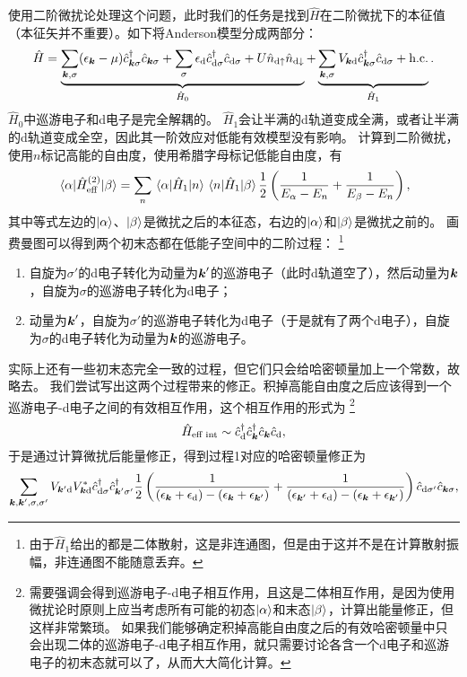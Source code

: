 \documentclass[hyperref, UTF8, a4paper]{ctexart}
\begin{document}
使用二阶微扰论处理这个问题，此时我们的任务是找到$\hat{H}$在二阶微扰下的本征值（本征矢并不重要）。如下将Anderson模型分成两部分：
\[
    \hat{H} = \underbrace{\sum_{\vb*{k}, \sigma} (\epsilon_{\vb*{k}} - \mu) \hat{c}_{\vb*{k}\sigma}^\dagger \hat{c}_{\vb*{k} \sigma} + \sum_\sigma \epsilon_\text{d} \hat{c}_{\text{d}\sigma}^\dagger \hat{c}_{\text{d} \sigma} + U \hat{n}_{\text{d} \uparrow} \hat{n}_{\text{d} \downarrow}}_{\hat{H}_0} + \underbrace{\sum_{\vb*{k}, \sigma} V_{\vb*{k} \text{d}} \hat{c}_{\vb*{k} \sigma}^\dagger \hat{c}_{\text{d} \sigma} + \text{h.c.}}_{\hat{H}_1}.
\]
$\hat{H}_0$中巡游电子和d电子是完全解耦的。
$\hat{H}_1$会让半满的d轨道变成全满，或者让半满的d轨道变成全空，因此其一阶效应对低能有效模型没有影响。
计算到二阶微扰，使用$n$标记高能的自由度，使用希腊字母标记低能自由度，有
\[
    \mel{\alpha}{\hat{H}_\text{eff}^{(2)}}{\beta} = \sum_n \mel{\alpha}{\hat{H}_1}{n} \mel{n}{\hat{H}_1}{\beta} \frac{1}{2} \left( \frac{1}{E_\alpha - E_n} + \frac{1}{E_\beta - E_n} \right),
\]
其中等式左边的$\ket{\alpha}$、$\ket{\beta}$是微扰之后的本征态，右边的$\ket{\alpha}$和$\ket{\beta}$是微扰之前的。
画费曼图可以得到两个初末态都在低能子空间中的二阶过程：%
\footnote{由于$\hat{H}_1$给出的都是二体散射，这是非连通图，但是由于这并不是在计算散射振幅，非连通图不能随意丢弃。}%
\begin{enumerate}
    \item 自旋为$\sigma'$的d电子转化为动量为$\vb*{k}'$的巡游电子（此时d轨道空了），然后动量为$\vb*{k}$，自旋为$\sigma$的巡游电子转化为d电子；
    \item 动量为$\vb*{k}'$，自旋为$\sigma'$的巡游电子转化为d电子（于是就有了两个d电子），自旋为$\sigma$的d电子转化为动量为$\vb*{k}$的巡游电子。
\end{enumerate}
实际上还有一些初末态完全一致的过程，但它们只会给哈密顿量加上一个常数，故略去。
我们尝试写出这两个过程带来的修正。积掉高能自由度之后应该得到一个巡游电子-d电子之间的有效相互作用，这个相互作用的形式为%
\footnote{需要强调会得到巡游电子-d电子相互作用，且这是二体相互作用，是因为使用微扰论时原则上应当考虑所有可能的初态$\ket{\alpha}$和末态$\ket{\beta}$，计算出能量修正，但这样非常繁琐。
如果我们能够确定积掉高能自由度之后的有效哈密顿量中只会出现二体的巡游电子-d电子相互作用，就只需要讨论各含一个d电子和巡游电子的初末态就可以了，从而大大简化计算。
}%
\[
    \hat{H}_\text{eff int} \sim \hat{c}^\dagger_{\text{d}} \hat{c}^\dagger_{\vb*{k}} \hat{c}_{\vb*{k}} \hat{c}_{\text{d}},
\]
于是通过计算微扰后能量修正，得到过程1对应的哈密顿量修正为
\[
    \sum_{\vb*{k}, \vb*{k}', \sigma, \sigma'} V_{\vb*{k}' \text{d}} V^*_{\vb*{k} \text{d}} 
    \hat{c}_{\text{d} \sigma}^\dagger \hat{c}^\dagger_{\vb*{k}' \sigma'} 
    \frac{1}{2} \left( 
        \frac{1}{(\epsilon_{\vb*{k}} + \epsilon_\text{d}) - (\epsilon_{\vb*{k}} + \epsilon_{\vb*{k}'})} + \frac{1}{(\epsilon_{\vb*{k}'} + \epsilon_\text{d}) - (\epsilon_{\vb*{k}} + \epsilon_{\vb*{k}'})} 
    \right)
    \hat{c}_{\text{d} \sigma'} \hat{c}_{\vb*{k} \sigma} ,
\]
\end{document}
